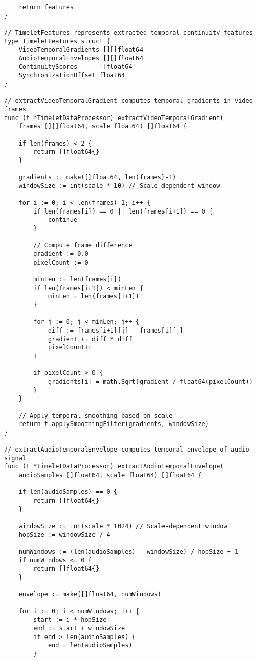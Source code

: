 \begin{tcolorbox}[colback=CodeBackground, colframe=DarkGray, title=Video-Audio Dataset Processing, fonttitle=\bfseries]
\begin{verbatim}
    return features
}

// TimeletFeatures represents extracted temporal continuity features
type TimeletFeatures struct {
    VideoTemporalGradients [][]float64
    AudioTemporalEnvelopes [][]float64
    ContinuityScores      []float64
    SynchronizationOffset float64
}

// extractVideoTemporalGradient computes temporal gradients in video frames
func (t *TimeletDataProcessor) extractVideoTemporalGradient(
    frames [][]float64, scale float64) []float64 {
    
    if len(frames) < 2 {
        return []float64{}
    }
    
    gradients := make([]float64, len(frames)-1)
    windowSize := int(scale * 10) // Scale-dependent window
    
    for i := 0; i < len(frames)-1; i++ {
        if len(frames[i]) == 0 || len(frames[i+1]) == 0 {
            continue
        }
        
        // Compute frame difference
        gradient := 0.0
        pixelCount := 0
        
        minLen := len(frames[i])
        if len(frames[i+1]) < minLen {
            minLen = len(frames[i+1])
        }
        
        for j := 0; j < minLen; j++ {
            diff := frames[i+1][j] - frames[i][j]
            gradient += diff * diff
            pixelCount++
        }
        
        if pixelCount > 0 {
            gradients[i] = math.Sqrt(gradient / float64(pixelCount))
        }
    }
    
    // Apply temporal smoothing based on scale
    return t.applySmoothingFilter(gradients, windowSize)
}

// extractAudioTemporalEnvelope computes temporal envelope of audio signal
func (t *TimeletDataProcessor) extractAudioTemporalEnvelope(
    audioSamples []float64, scale float64) []float64 {
    
    if len(audioSamples) == 0 {
        return []float64{}
    }
    
    windowSize := int(scale * 1024) // Scale-dependent window
    hopSize := windowSize / 4
    
    numWindows := (len(audioSamples) - windowSize) / hopSize + 1
    if numWindows <= 0 {
        return []float64{}
    }
    
    envelope := make([]float64, numWindows)
    
    for i := 0; i < numWindows; i++ {
        start := i * hopSize
        end := start + windowSize
        if end > len(audioSamples) {
            end = len(audioSamples)
        }
        

\end{verbatim}
\end{tcolorbox}
